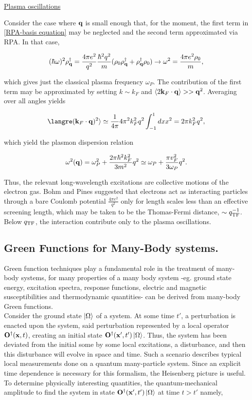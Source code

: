 \underline{Plasma oscillations}

Consider the case where ${\bf q}$ is small enough that, for the moment, the first term in \cref{RPA-basis equation} may be neglected and the second term approximated via RPA. In that case, 

$$
(\hbar \omega)^2 \rho_{{\bf q}}^\dagger = \frac{4\pi e^2}{q^2} \frac{\hbar^2 q^2}{m} (\rho_0 \rho_{{\bf q}}^\dagger + \rho_{{\bf q}}^\dagger \rho_0 ) \rightarrow \omega^2 = \frac{4\pi e^2 \rho_0}{m},
$$

which gives just the classical plasma frequency $\omega_P$. The contribution of the first term may be approximated by setting $k \sim k_F$ and $\langle 2 {\bf k}_F \cdot {\bf q} \rangle >> {\bf q}^2$. Averaging over all angles yields

$$
\langre ({\bf k}_F \cdot {\bf q})^2 \rangle \simeq \frac{1}{4\pi} 4\pi^2 k_F^2 q^2 \int_{-1}^{1} dx x^2 = 2\pi k_F^2 q^2, 
$$

which yield the plasmon dispersion relation

$$
\omega^2({\bf q}) = \omega_P^2 + \frac{2\pi \hbar^2 k_F^2}{3m^2} q^2 \simeq \omega_P + \frac{\pi v_F^2}{3\omega_P} q^2. 
$$

Thus, the relevant long-wavelength excitations are collective motions of the electron gas. Bohm and Pines suggested that electrons act as interacting particles through a bare Coulomb potential $\frac{4\pi e^2}{q^2}$ only for length scales less than an effective screening length, which may be taken to be the Thomas-Fermi distance, $\sim q_{\textnormal{TF}}^{-1}$. Below $q_{\textnormal{TF}}$, the interaction contribute only to the plasma oscillations. \\

\subsection{Green Functions for Many-Body systems.}

Green function techniques play a fundamental role in the treatment of many-body systems, for many properties of a many body system -eg. ground state energy, excitation spectra, response functions, electric and magnetic susceptibilities and thermodynamic quantities- can be derived from many-body Green functions.\\

Consider the ground state $\ket{\Omega}$ of a system. At some time $t'$, a perturbation is enacted upon the system, said perturbation represented by a local operator ${\bf O}^\dagger({\bf x}, t)$, creating an initial state ${\bf O}^\dagger({\bf x}', t') \ket{\Omega}$. Thus, the system has been deviated from the initial some by some local excitations, a disturbance, and then this disturbance will evolve in space and time. Such a scenario describes typical local measurements done on a quantum many-particle system. Since an explicit time dependence is necessary for this formalism, the Heisenberg picture is useful. To determine physically interesting quantities, the quantum-mechanical amplitude to find the system in state ${\bf O}^\dagger({\bf x}', t') \ket{\Omega}$ at time $t > t'$ namely, 

